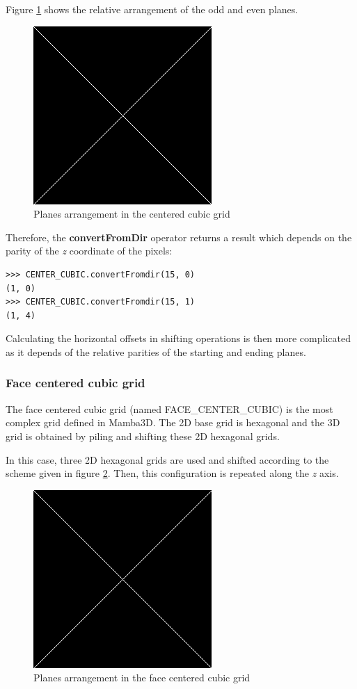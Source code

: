 \documentclass[a4paper,10pt,oneside]{article}
\begin{document}
Figure \ref{fig:CC_grid} shows the relative arrangement of the odd and even planes.

\begin{figure}
\centering
\includegraphics[scale=0.3]{figures/xxx.png}
\caption{Planes arrangement in the centered cubic grid}
\label{fig:CC_grid}
\end{figure}

Therefore, the \textbf{convertFromDir} operator returns a result which depends on the parity of the \emph{z} coordinate of the pixels:

\lstset{language=Python}
\begin{lstlisting}
>>> CENTER_CUBIC.convertFromdir(15, 0)
(1, 0)
>>> CENTER_CUBIC.convertFromdir(15, 1)
(1, 4)
\end{lstlisting}

Calculating the horizontal offsets in shifting operations is then more complicated as it depends of the relative parities
of the starting and ending planes.

\subsubsection{Face centered cubic grid}
\label{cha:FCCgrid}
The face centered cubic grid (named FACE\_CENTER\_CUBIC) is the most complex grid defined in Mamba3D. The 2D base grid is hexagonal
and the 3D grid is obtained by piling and shifting these 2D hexagonal grids.

In this case, three 2D hexagonal grids are used and shifted according to the scheme given in figure \ref{fig:FCC_grid}. Then, this configuration
is repeated along the \emph{z} axis.

\begin{figure}
\centering
\includegraphics[scale=0.3]{figures/xxx.png}
\caption{Planes arrangement in the face centered cubic grid}
\label{fig:FCC_grid}
\end{figure}
\end{document}
